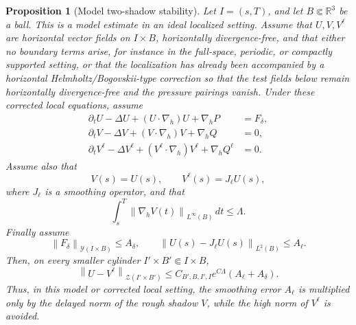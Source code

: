 \documentclass[pdflatex,sn-mathphys-num]{sn-jnl}
\numberwithin{equation}{section}
\theoremstyle{thmstyleone}
\newtheorem{proposition}[theorem]{Proposition}
\theoremstyle{thmstylethree}
\newcommand{\R}{\mathbb R}
\newcommand{\dt}{\,dt}
\newcommand{\nabh}{\nabla_h}
\newcommand{\norm}[2]{\left\|#1\right\|_{#2}}
\newcommand{\calY}{\mathcal Y}
\newcommand{\calZ}{\mathcal Z}
\begin{document}
\begin{proposition}[Model two-shadow stability]
\label{prop:two-shadow}
Let \(I=(s,T)\), and let \(B\Subset\R^3\) be a ball.  This is a model estimate in an ideal localized setting.  Assume that \(U,V,V^\ell\) are horizontal vector fields on \(I\times B\), horizontally divergence-free, and that either no boundary terms arise, for instance in the full-space, periodic, or compactly supported setting, or that the localization has already been accompanied by a horizontal Helmholtz/Bogovskii-type correction so that the test fields below remain horizontally divergence-free and the pressure pairings vanish.  Under these corrected local equations, assume
\begin{align}
\partial_tU-\Delta U+(U\cdot\nabh)U+\nabh P&=F_\delta,\label{eq:U-shadow}\\
\partial_tV-\Delta V+(V\cdot\nabh)V+\nabh Q&=0,\label{eq:rough-shadow}\\
\partial_tV^\ell-\Delta V^\ell+(V^\ell\cdot\nabh)V^\ell+\nabh Q^\ell&=0.\label{eq:smooth-shadow}
\end{align}
Assume also that
\[
        V(s)=U(s),
        \qquad
        V^\ell(s)=J_\ell U(s),
\]
where \(J_\ell\) is a smoothing operator, and that
\begin{equation}
        \int_s^T\norm{\nabh V(t)}{L^\infty(B)}\dt\le\Lambda.
        \label{eq:rough-bound}
\end{equation}
Finally assume
\begin{equation}
        \norm{F_\delta}{\calY(I\times B)}\le A_\delta,
        \qquad
        \norm{U(s)-J_\ell U(s)}{L^2(B)}\le A_\ell.
        \label{eq:two-shadow-data}
\end{equation}
Then, on every smaller cylinder \(I'\times B'\Subset I\times B\),
\begin{equation}
        \norm{U-V^\ell}{\calZ(I'\times B')}
        \le C_{B',B,I',I}e^{C\Lambda}(A_\ell+A_\delta).
        \label{eq:two-shadow-estimate}
\end{equation}
Thus, in this model or corrected local setting, the smoothing error \(A_\ell\) is multiplied only by the delayed norm of the rough shadow \(V\), while the high norm of \(V^\ell\) is avoided.
\end{proposition}
\end{document}
